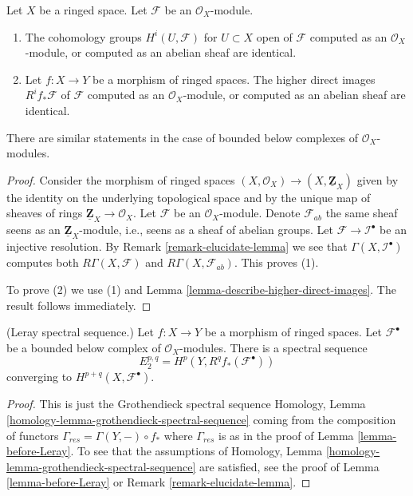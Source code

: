 \begin{lemma}
\label{lemma-modules-abelian}
Let $X$ be a ringed space.
Let $\mathcal{F}$ be an $\mathcal{O}_X$-module.
\begin{enumerate}
\item The cohomology groups $H^i(U, \mathcal{F})$ for $U \subset X$ open
of $\mathcal{F}$ computed as an $\mathcal{O}_X$-module, or computed as an
abelian sheaf are identical.
\item Let $f : X \to Y$ be a morphism of ringed spaces.
The higher direct images $R^if_*\mathcal{F}$ of $\mathcal{F}$
computed as an $\mathcal{O}_X$-module, or computed as an abelian sheaf
are identical.
\end{enumerate}
There are similar statements in the case of bounded below
complexes of $\mathcal{O}_X$-modules.
\end{lemma}

\begin{proof}
Consider the morphism of ringed spaces
$(X, \mathcal{O}_X) \to (X, \underline{\mathbf{Z}}_X)$ given
by the identity on the underlying topological space and by
the unique map of sheaves of rings
$\underline{\mathbf{Z}}_X \to \mathcal{O}_X$.
Let $\mathcal{F}$ be an $\mathcal{O}_X$-module.
Denote $\mathcal{F}_{ab}$ the same sheaf seens as an
$\underline{\mathbf{Z}}_X$-module, i.e., seens as a sheaf of
abelian groups. Let
$\mathcal{F} \to \mathcal{I}^\bullet$ be an injective resolution.
By Remark \ref{remark-elucidate-lemma} we see that
$\Gamma(X, \mathcal{I}^\bullet)$ computes both
$R\Gamma(X, \mathcal{F})$ and $R\Gamma(X, \mathcal{F}_{ab})$.
This proves (1).

\medskip\noindent
To prove (2) we use (1) and Lemma \ref{lemma-describe-higher-direct-images}.
The result follows immediately.
\end{proof}

\begin{lemma}
\label{lemma-Leray}
(Leray spectral sequence.)
Let $f : X \to Y$ be a morphism of ringed spaces.
Let $\mathcal{F}^\bullet$ be
a bounded below complex of $\mathcal{O}_X$-modules.
There is a spectral sequence
$$
E_2^{p, q} = H^p(Y, R^qf_*(\mathcal{F}^\bullet))
$$
converging to $H^{p + q}(X, \mathcal{F}^\bullet)$.
\end{lemma}

\begin{proof}
This is just the Grothendieck spectral sequence
Homology, Lemma \ref{homology-lemma-grothendieck-spectral-sequence}
coming from the composition of functors
$\Gamma_{res} = \Gamma(Y, -) \circ f_*$ where $\Gamma_{res}$ is as
in the proof of Lemma \ref{lemma-before-Leray}.
To see that the assumptions of
Homology, Lemma \ref{homology-lemma-grothendieck-spectral-sequence}
are satisfied, see the proof of Lemma \ref{lemma-before-Leray} or
Remark \ref{remark-elucidate-lemma}.
\end{proof}


